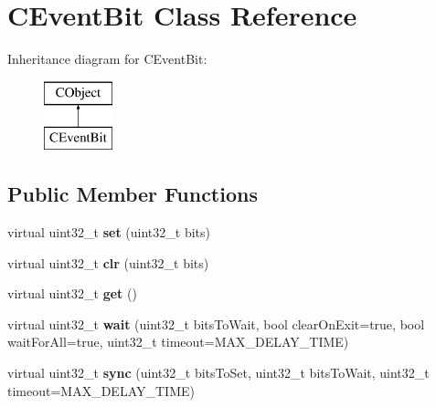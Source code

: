 \hypertarget{class_c_event_bit}{\section{C\-Event\-Bit Class Reference}
\label{class_c_event_bit}
}
Inheritance diagram for C\-Event\-Bit\-:\begin{figure}[H]
\begin{center}
\leavevmode
\includegraphics[height=2.000000cm]{class_c_event_bit}
\end{center}
\end{figure}
\subsection*{Public Member Functions}
\begin{DoxyCompactItemize}
\item 
\hypertarget{class_c_event_bit_a0b05da65aa8bb0b77dd75f0a84b8fbb0}{virtual uint32\-\_\-t {\bfseries set} (uint32\-\_\-t bits)}\label{class_c_event_bit_a0b05da65aa8bb0b77dd75f0a84b8fbb0}

\item 
\hypertarget{class_c_event_bit_ade8e4420bd49ab351417ca955bb293e3}{virtual uint32\-\_\-t {\bfseries clr} (uint32\-\_\-t bits)}\label{class_c_event_bit_ade8e4420bd49ab351417ca955bb293e3}

\item 
\hypertarget{class_c_event_bit_a52b137d375dbb670b2473222c8914081}{virtual uint32\-\_\-t {\bfseries get} ()}\label{class_c_event_bit_a52b137d375dbb670b2473222c8914081}

\item 
\hypertarget{class_c_event_bit_a4183fe9b9d9cc00cd0ae806c9aaba461}{virtual uint32\-\_\-t {\bfseries wait} (uint32\-\_\-t bits\-To\-Wait, bool clear\-On\-Exit=true, bool wait\-For\-All=true, uint32\-\_\-t timeout=M\-A\-X\-\_\-\-D\-E\-L\-A\-Y\-\_\-\-T\-I\-M\-E)}\label{class_c_event_bit_a4183fe9b9d9cc00cd0ae806c9aaba461}

\item 
\hypertarget{class_c_event_bit_a4a50fd1376946d508762fa00d01034ce}{virtual uint32\-\_\-t {\bfseries sync} (uint32\-\_\-t bits\-To\-Set, uint32\-\_\-t bits\-To\-Wait, uint32\-\_\-t timeout=M\-A\-X\-\_\-\-D\-E\-L\-A\-Y\-\_\-\-T\-I\-M\-E)}\label{class_c_event_bit_a4a50fd1376946d508762fa00d01034ce}

\end{DoxyCompactItemize}
